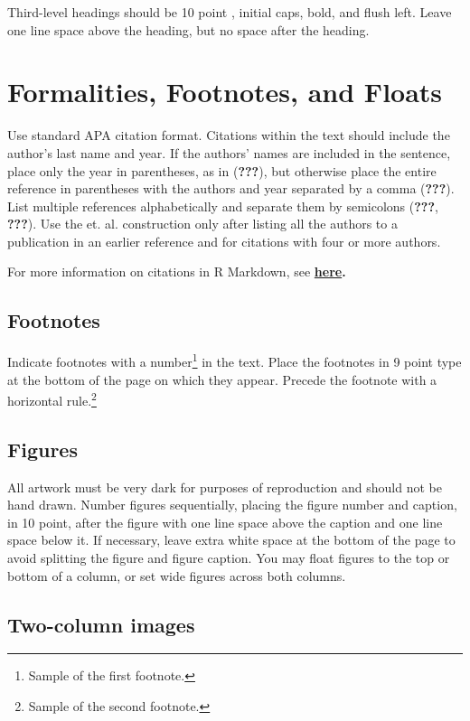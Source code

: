 \documentclass[10pt, letterpaper]{article}
\begin{document}
Third-level headings should be 10 point , initial caps, bold, and flush
left. Leave one line space above the heading, but no space after the
heading.

\section{Formalities, Footnotes, and
Floats}\label{formalities-footnotes-and-floats}

Use standard APA citation format. Citations within the text should
include the author's last name and year. If the authors' names are
included in the sentence, place only the year in parentheses, as in
({\textbf{???}}), but otherwise place the entire reference in
parentheses with the authors and year separated by a comma
({\textbf{???}}). List multiple references alphabetically and separate
them by semicolons ({\textbf{???}}, {\textbf{???}}). Use the et. al.
construction only after listing all the authors to a publication in an
earlier reference and for citations with four or more authors.

For more information on citations in R Markdown, see
\textbf{\href{http://rmarkdown.rstudio.com/authoring_bibliographies_and_citations.html\#citations}{here}.}

\subsection{Footnotes}\label{footnotes}

Indicate footnotes with a number\footnote{Sample of the first
footnote.} in the text. Place the footnotes in 9 point type at the
bottom of the page on which they appear. Precede the footnote with a
horizontal rule.\footnote{Sample of the second footnote.}

\subsection{Figures}\label{figures}

All artwork must be very dark for purposes of reproduction and should
not be hand drawn. Number figures sequentially, placing the figure
number and caption, in 10 point, after the figure with one line space
above the caption and one line space below it. If necessary, leave extra
white space at the bottom of the page to avoid splitting the figure and
figure caption. You may float figures to the top or bottom of a column,
or set wide figures across both columns.

\subsection{Two-column images}\label{two-column-images}
\end{document}
